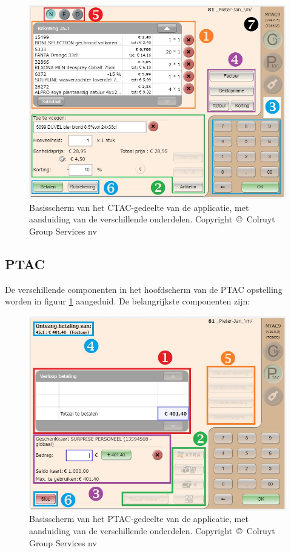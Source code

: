 \begin{figure}[h!]
    \centering
    \includegraphics[scale=0.7]{img/func-omsch/CLP-CTAC-Aanduidingen.jpg}
    \caption{Basisscherm van het CTAC-gedeelte van de applicatie, met aanduiding van de verschillende onderdelen. \scriptsize Copyright~\copyright~Colruyt Group Services nv}
    \label{fig:Ctac-Aangeduid}
\end{figure}

\subsection{PTAC}

De verschillende componenten in het hoofdscherm van de PTAC opstelling worden in figuur \ref{fig:Ctac-Aangeduid} aangeduid. De belangrijkste componenten zijn:

\begin{figure}[h!]
    \centering
    \includegraphics[scale=0.7]{img/func-omsch/CLP-PTAC-Aanduidingen.jpg}
    \caption{Basisscherm van het PTAC-gedeelte van de applicatie, met aanduiding van de verschillende onderdelen. \scriptsize Copyright~\copyright~Colruyt Group Services nv}
    \label{fig:Ptac-Aangeduid}
\end{figure}

